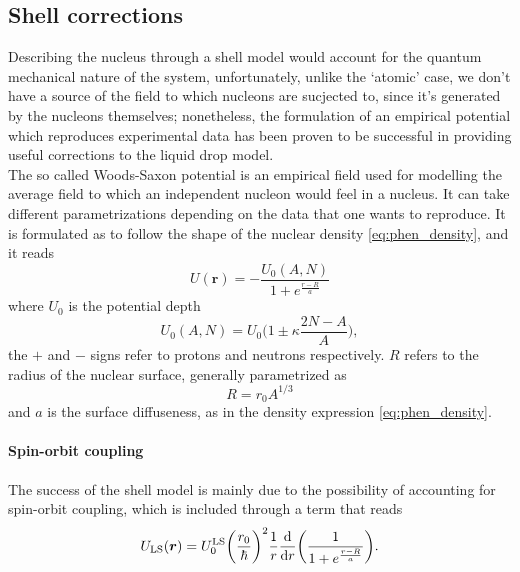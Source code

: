 \subsection{Shell corrections}
Describing the nucleus through a shell model would account for the quantum mechanical nature of the system, unfortunately, unlike the `atomic' case, we don't have a source of the field to which nucleons are sucjected to, since it's generated by the nucleons themselves; nonetheless, the formulation of an empirical potential which reproduces experimental data has been proven to be successful in providing useful corrections to the liquid drop model.
\\The so called Woods-Saxon potential is an empirical field used for modelling the average field to which an independent nucleon would feel in a nucleus. It can take different parametrizations depending on the data that one wants to reproduce. It is formulated as to follow the shape of the nuclear density \eqref{eq:phen_density}, and it reads
\begin{equation}
    \label{eq:sphWS}
    U(\bm r) = -\frac{U_0(A, N)}{1+e^\frac{r - R}{a}}
\end{equation}
where $U_0$ is the potential depth
\begin{equation}
    U_0(A, N) = U_0\bigg(1\pm \kappa \frac{2N -A }A\bigg),
\end{equation}
the $+$ and $-$ signs refer to protons and neutrons respectively. $R$ refers to the radius of the nuclear surface, generally parametrized as 
\begin{equation}
    R=r_0 A^{1/3}
\end{equation}
and $a$ is the surface diffuseness, as in the density expression \eqref{eq:phen_density}.
\paragraph{Spin-orbit coupling} 
The success of the shell model is mainly due to the possibility of accounting for spin-orbit coupling, which is included through a term that reads
\begin{equation}
    U_{\text{LS}}(\bm r )=U_0^{\text{LS}}\bigg(\frac{r_0}{\hbar}\bigg)^2 \frac 1 r \dv{}{r}\bigg (\frac{1}{1+e^{\frac{r-R}{a}}}\bigg).
\end{equation}
